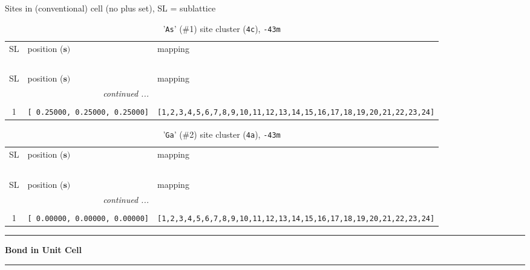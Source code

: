 \documentclass[fleqn,10pt,landscape]{jsarticle}
\begin{document}
\noindent Sites in (conventional) cell (no plus set), SL = sublattice

\renewcommand{\arraystretch}{1.6}
\begin{longtable}[l]{cll}
\captionsetup{justification=raggedright, singlelinecheck=off}
\caption{'\texttt{As}' (\#1) site cluster (\texttt{4c}), \texttt{-43m}}
 \\
 \hline \hline
SL & position ($\bm{s})$ & mapping \\ \hline \endfirsthead

\multicolumn{2}{l}{\tablename\ \thetable{}} \\
 \hline \hline
SL & position ($\bm{s})$ & mapping \\ \hline \endhead

 \hline \hline
\multicolumn{2}{r}{\footnotesize\it continued ...} \\ \endfoot

 \hline \hline
\multicolumn{2}{r}{} \\ \endlastfoot

1 & \texttt{[ 0.25000, 0.25000, 0.25000]} & \texttt{[1,2,3,4,5,6,7,8,9,10,11,12,13,14,15,16,17,18,19,20,21,22,23,24]} \\
\end{longtable}
\renewcommand{\arraystretch}{1.6}
\begin{longtable}[l]{cll}
\captionsetup{justification=raggedright, singlelinecheck=off}
\caption{'\texttt{Ga}' (\#2) site cluster (\texttt{4a}), \texttt{-43m}}
 \\
 \hline \hline
SL & position ($\bm{s})$ & mapping \\ \hline \endfirsthead

\multicolumn{2}{l}{\tablename\ \thetable{}} \\
 \hline \hline
SL & position ($\bm{s})$ & mapping \\ \hline \endhead

 \hline \hline
\multicolumn{2}{r}{\footnotesize\it continued ...} \\ \endfoot

 \hline \hline
\multicolumn{2}{r}{} \\ \endlastfoot

1 & \texttt{[ 0.00000, 0.00000, 0.00000]} & \texttt{[1,2,3,4,5,6,7,8,9,10,11,12,13,14,15,16,17,18,19,20,21,22,23,24]} \\
\end{longtable}
\vspace{5mm}
\noindent \rule[0.5mm]{5mm}{0.5mm}\hspace{3mm}\textbf{Bond in Unit Cell}\hspace{3mm}\leaders\hrule height 0.5mm\hfill\kern0pt
\vspace{3mm}
\end{document}
